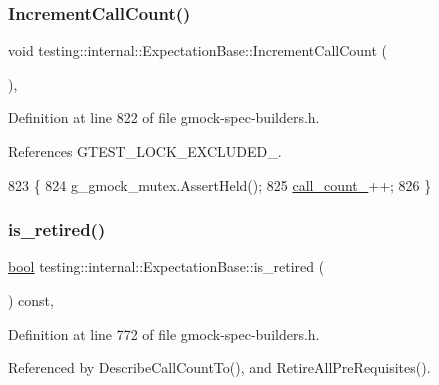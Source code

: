\subsubsection{\texorpdfstring{Increment\+Call\+Count()}{IncrementCallCount()}}
{\footnotesize\ttfamily void testing\+::internal\+::\+Expectation\+Base\+::\+Increment\+Call\+Count (\begin{DoxyParamCaption}{ }\end{DoxyParamCaption})\hspace{0.3cm}{\ttfamily [inline]}, {\ttfamily [protected]}}



Definition at line 822 of file gmock-\/spec-\/builders.\+h.



References G\+T\+E\+S\+T\+\_\+\+L\+O\+C\+K\+\_\+\+E\+X\+C\+L\+U\+D\+E\+D\+\_\+.


\begin{DoxyCode}
823                                                     \{
824     g\_gmock\_mutex.AssertHeld();
825     \hyperlink{classtesting_1_1internal_1_1ExpectationBase_aea95d46f7583566e3f7a081b0668ad4c}{call\_count\_}++;
826   \}
\end{DoxyCode}
\mbox{\label{classtesting_1_1internal_1_1ExpectationBase_afe539dbc5b29d9635403767a4708c476}} 
\subsubsection{\texorpdfstring{is\+\_\+retired()}{is\_retired()}}
{\footnotesize\ttfamily \hyperlink{classbool}{bool} testing\+::internal\+::\+Expectation\+Base\+::is\+\_\+retired (\begin{DoxyParamCaption}{ }\end{DoxyParamCaption}) const\hspace{0.3cm}{\ttfamily [inline]}, {\ttfamily [protected]}}



Definition at line 772 of file gmock-\/spec-\/builders.\+h.



Referenced by Describe\+Call\+Count\+To(), and Retire\+All\+Pre\+Requisites().


